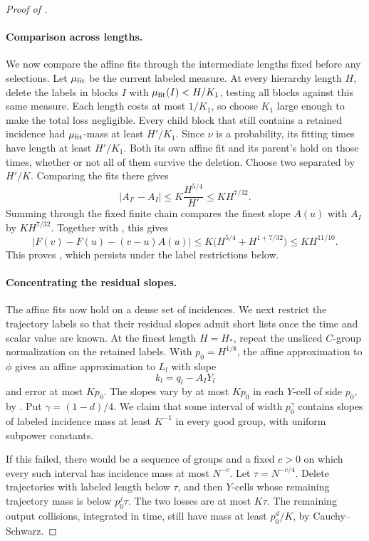 \begin{proof}[Proof of ]
\paragraph{Comparison across lengths.}
We now compare the affine fits through the intermediate lengths fixed
before any selections.  Let \(\mu_{\rm fit}\) be the current labeled
measure.  At every hierarchy length \(H\), delete the labels in
blocks \(I\) with \(\mu_{\rm fit}(I)<H/K_1\), testing all blocks
against this same measure.  Each length costs at most \(1/K_1\), so
choose \(K_1\) large enough to make the total loss negligible.
Every child block that still contains a retained incidence had
\(\mu_{\rm fit}\)-mass at least \(H'/K_1\).  Since \(\nu\) is a
probability, its fitting times have length at least \(H'/K_1\).
Both its own affine fit and its parent's hold on those times,
whether or not all of them survive the deletion.  Choose two separated
by \(H'/K\).  Comparing the fits there gives
\[
 |A_{I'}-A_I|
 \le K\frac{H^{5/4}}{H'}\le KH^{7/32}.
\]
Summing through the fixed finite chain compares the finest slope
\(A(u)\) with \(A_I\) by \(KH^{7/32}\).
Together with , this gives
\[
 |F(v)-F(u)-(v-u)A(u)|
 \le K\bigl(H^{5/4}+H^{1+7/32}\bigr)\le KH^{11/10}.
\]
This proves , which persists under the label
restrictions below.

\paragraph{Concentrating the residual slopes.}
The affine fits now hold on a dense set of incidences.  We next restrict
the trajectory labels so that their residual slopes admit short lists
once the time and scalar value are known.
At the finest length \(H=H_*\), repeat the unsliced \(C\)-group
normalization on the retained labels.
With \(p_0=H^{1/8}\), the affine approximation to \(\phi\) gives an
affine approximation to \(L_l\) with slope
\[
 k_l=q_l-A_IY_l
\]
and error at most \(Kp_0\).
The slopes vary by at most \(Kp_0\) in each \(Y\)-cell of side \(p_0\),
by .
Put \(\gamma=(1-d)/4\).
We claim that some interval of width \(p_0^\gamma\) contains slopes of
labeled incidence mass at least \(K^{-1}\) in every good group,
with uniform subpower constants.

If this failed, there would be a sequence of groups and a fixed
\(c>0\) on which every such interval has incidence mass at most
\(N^{-c}\).  Let \(\tau=N^{-c/4}\).
Delete trajectories with labeled length below \(\tau\), and then
\(Y\)-cells whose remaining trajectory mass is below \(p_0^j\tau\).
The two losses are at most \(K\tau\).
The remaining output collisions, integrated in time, still have mass
at least \(p_0^d/K\), by Cauchy--Schwarz.


\end{proof}

